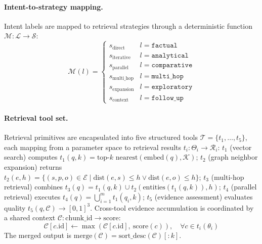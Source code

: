 \documentclass[runningheads]{llncs}
\begin{document}
\paragraph{Intent-to-strategy mapping.}
Intent labels are mapped to retrieval strategies through a deterministic function $\mathcal{M}: \mathcal{L} \to \mathcal{S}$:
\begin{equation}
    \mathcal{M}(l) = \begin{cases}
    s_{\text{direct}} & l = \texttt{factual} \\
    s_{\text{iterative}} & l = \texttt{analytical} \\
    s_{\text{parallel}} & l = \texttt{comparative} \\
    s_{\text{multi\_hop}} & l = \texttt{multi\_hop} \\
    s_{\text{expansion}} & l = \texttt{exploratory} \\
    s_{\text{context}} & l = \texttt{follow\_up}
    \end{cases}
\end{equation}

\paragraph{Retrieval tool set.}
Retrieval primitives are encapsulated into five structured tools $\mathcal{T} = \{t_1, \ldots, t_5\}$, each mapping from a parameter space to retrieval results $t_i: \Theta_i \to \mathcal{R}_i$: $t_1$ (vector search) computes $t_1(q, k) = \text{top-}k\text{ nearest}(\text{embed}(q), \mathcal{K})$; $t_2$ (graph neighbor expansion) returns $t_2(e, h) = \{(s, p, o) \in \mathcal{E} \mid \text{dist}(e, s) \leq h \vee \text{dist}(e, o) \leq h\}$; $t_3$ (multi-hop retrieval) combines $t_3(q) = t_1(q, k) \cup t_2(\text{entities}(t_1(q, k)), h)$; $t_4$ (parallel retrieval) executes $t_4(q) = \bigcup_{i=1}^{m} t_1(q_i, k)$; $t_5$ (evidence assessment) evaluates quality $t_5(q, \mathcal{C}) \to [0,1]^3$. Cross-tool evidence accumulation is coordinated by a shared context $\mathcal{C}: \text{chunk\_id} \to \text{score}$:
\begin{equation}
    \mathcal{C}[c.\text{id}] \leftarrow \max(\mathcal{C}[c.\text{id}],\ \text{score}(c)), \quad \forall c \in t_i(\theta_i)
\end{equation}
The merged output is $\text{merge}(\mathcal{C}) = \text{sort\_desc}(\mathcal{C})[:k]$.
\end{document}
